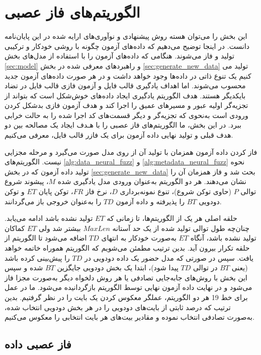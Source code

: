 \section{الگوریتم‌های فاز عصبی}\label{sec:neural_fuzzing_algorithms}
این بخش را می‌توان هسته روش پیشنهادی و نوآوری‌های ارایه شده در این پایان‌نامه دانست. در اینجا توضیح می‌دهیم که داده‌های آزمون چگونه با روشی خودکار و ترکیبی تولید و فاز می‌شوند. هنگامی که داده‌های آزمون را با استفاده از مدل‌های بخش \ref{sec:model} و راهبردهای معرفی شده در بخش \ref{sec:generate_new_data} تولید می کنیم یک تنوع ذاتی در داده‌ها وجود خواهد داشت و در هر صورت داده‌های آزمون جدید محسوب می‌شوند. اما اهداف یادگیری قالب فایل و آزمون فازی قالب فایل در تضاد بایکدیگر هستند. هدف الگوریتم یادگیری ایجاد داده‌های خوش‌شکل است که بتواند از تجزیه‌گر اولیه عبور و مسیرهای عمیق را اجرا کند و هدف آزمون فازی بد‌شکل کردن ورودی است به‌نحوی که تجزیه‌گر و دیگر قسمت‌های کد اجرا شده را به حالت خرابی ببرد. در این بخش، ما الگوریتم‌های فاز عصبی را با هـدف ایجاد یک مصالحه بین دو هدف قبلی و تولید نهایی داده آزمون برای یک فازر قالب فایل، معرفی می‌کنیم. 

فاز کردن داده آزمون همزمان با تولید آن از روی مدل صورت می‌گیرد و مرحله مجزایی نیست. الگوریتم‌های \ref{alg:data_neural_fuzz} و \ref{alg:metadata_neural_fuzz} نحوه تولید داده آزمون که در بخش \ref{sec:generate_new_data} بحث شد و فاز همزمان آن را نشان می‌دهند. هر دو الگوریتم به‌عنوان ورودی مدل یادگیری شده $M$، پیشوند شروع توالی $P$ (حاوی توکن شروع)، تنوع نمونه‌برداری $D$، نرخ فاز $FR$، توکن پایان $ET$ و توکن دودویی $BT$ را پذیرفته و داده آزمون $TD$ را به‌عنوان خروجی باز می‌گردانند.

حلقه اصلی هر یک از الگوریتم‌ها، تا زمانی که $ET$ تولید نشده باشد ادامه‌ می‌یابد. چنان‌چه طول توالی تولید شده از یک حد آستانه
 $MaxLen$
 بیشتر شد ولی 
 $ET$ 
 کماکان تولید نشده باشد، آنگاه $ET$ به‌صورت خودکار به انتهای $TD$ اضافه می‌شود تا الگوریتم از حلقه تکرار بیرون آید. بدین ترتیب مطمئن می‌شویم که الگوریتم هموراه خاتمه خواهد یافت. سپس در صورتی که مدل حضور یک داده دودویی در $TD$ را پیش‌بینی کرده باشد (یعنی $BT$ در توالی $TD$ پیدا شود)، ابتدا یک بخش دودویی جایگزین $BT$ شده و سپس این بخش با روش‌های جابه‌جایی تصادفی یا هر روش دلخواه دیگر به‌صورت مجزا فاز می‌شود و در نهایت داده آزمون نهایی توسط الگوریتم بازگردانیده می‌شود. ما در عمل برای خط 19 هر دو الگوریتم، عملگر معکوس کردن یک بایت را در نظر گرفتیم. بدین ترتیب که درصد ثابتی از بایت‌های دودویی را در هر بخش دودویی انتخاب شده، به‌صورت تصادفی انتخاب نموده و مقادیر بیت‌های هر بایت انتخابی را معکوس می‌کنیم.
 
 \subsection{فاز عصبی داده}
 
